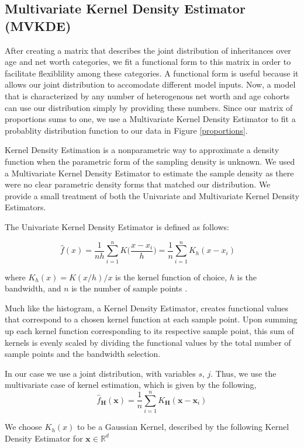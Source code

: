\documentclass[letterpaper,12pt]{article}
\theoremstyle{definition}
\begin{document}
\begin{spacing}{1.5}
  \subsection{Multivariate Kernel Density Estimator (MVKDE)}\label{SecDistMVKDE}


    After creating a matrix that describes the joint distribution of inheritances over age and net worth categories, we fit a functional form to this matrix in order to facilitate flexiblility among these categories. A functional form is useful because it allows our joint distribution to accomodate different model inputs. Now, a model that is characterized by any number of heterogenous net worth and age cohorts can use our distribution simply by providing these numbers. Since our matrix of proportions sums to one, we use a Multivariate Kernel Density Estimator to fit a probablity distribution function to our data in Figure \ref{proportions}.


    Kernel Density Estimation is a nonparametric way to approximate a density function when the parametric form of the sampling density is unknown. We used a Multivariate Kernel Density Estimator to estimate the sample density as there were no clear parametric density forms that matched our distribution. We provide a small treatment of both the Univariate and Multivariate Kernel Density Estimators.
    
    The Univariate Kernel Density Estimator is defined as follows:

    \[\hat{f}(x) = \frac{1}{nh} \sum_{i=1}^n K\Big(\frac{x-x_i}{h}\Big)= \frac{1}{n}\sum_{i=1}^n K_h (x - x_i) \quad \]

    where $K_h(x) =  K(x/h)/x$ is the kernel function of choice, $h$ is the bandwidth, and $n$ is the number of sample points \citet{Scott:2015}. 

    Much like the histogram, a Kernel Density Estimator, creates functional values that correspond to a chosen kernel function at each sample point. Upon summing up each kernel function corresponding to its respective sample point, this sum of kernels is evenly scaled by dividing the functional values by the total number of sample points and the bandwidth selection.

    In our case we use a joint distribution, with variables $s$, $j$. Thus, we use the multivariate case of kernel estimation, which is given by the following,
    \[\hat{f}_\mathbf{H}(\mathbf{x})= \frac1n \sum_{i=1}^n K_\mathbf{H} (\mathbf{x} - \mathbf{x}_i)\]

    We choose $K_h(x)$ to be a Gaussian Kernel, described by the following Kernel Density Estimator for $\mathbf{x} \in \mathbb{R}^d$


\end{spacing}
\end{document}
